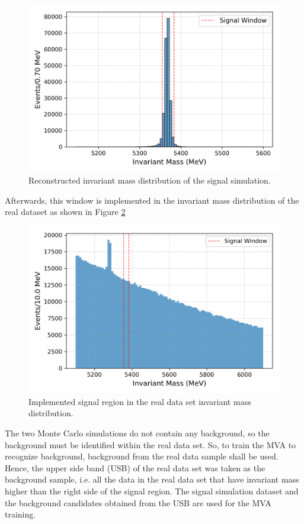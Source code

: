     \begin{figure}[H]
        \centering
        \includegraphics[width=0.7\linewidth]{Figure/3_signal_invariant_mass_distribution_99_data.png}
        \caption{Reconstructed invariant mass distribution of the signal simulation.}
        \label{in_mass_sig}
    \end{figure}
    Afterwards, this window is implemented in the invariant mass distribution of the real dataset as shown in Figure \ref{inv_mass_data_99}\\
    \begin{figure}[H]
        \centering
        \includegraphics[width=0.7\linewidth]{Figure/4_data_invariant_mass_distribution.png}
        \caption{Implemented signal region in the real data set invariant mass distribution.}
        \label{inv_mass_data_99}
    \end{figure}
    
    The two Monte Carlo simulations do not contain any background, so the background must be identified within the real data set. So, to train the MVA to recognize background, background from the real data sample shall be used. Hence, the upper side band (USB) of the real data set was taken as the background sample, i.e. all the data in the real data set that have invariant mass higher than the right side of the signal region. The signal simulation dataset and the background candidates obtained from the USB are used for the MVA training.\\

